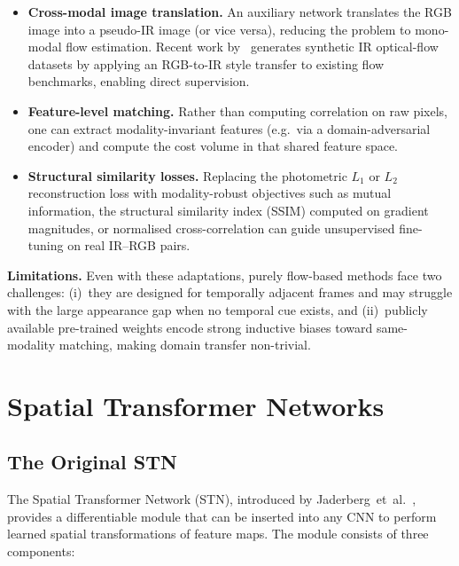 \begin{itemize}
    \item \textbf{Cross-modal image translation.}  An auxiliary network
          translates the RGB image into a pseudo-IR image (or vice
          versa), reducing the problem to mono-modal flow estimation.
          Recent work by~\cite{bird2024rgb2ir} generates synthetic IR
          optical-flow datasets by applying an RGB-to-IR style transfer
          to existing flow benchmarks, enabling direct supervision.
    \item \textbf{Feature-level matching.}  Rather than computing
          correlation on raw pixels, one can extract modality-invariant
          features (e.g.\ via a domain-adversarial encoder) and compute
          the cost volume in that shared feature space.
    \item \textbf{Structural similarity losses.}  Replacing the
          photometric $L_1$ or $L_2$ reconstruction loss with
          modality-robust objectives such as mutual information, the
          structural similarity index (SSIM) computed on gradient
          magnitudes, or normalised cross-correlation can guide
          unsupervised fine-tuning on real IR--RGB pairs.
\end{itemize}

\noindent\textbf{Limitations.}  Even with these adaptations, purely
flow-based methods face two challenges: (i)~they are designed for
temporally adjacent frames and may struggle with the large appearance
gap when no temporal cue exists, and (ii)~publicly available
pre-trained weights encode strong inductive biases toward same-modality
matching, making domain transfer non-trivial.


\section{Spatial Transformer Networks}
\label{sec:stn}

\subsection{The Original STN}

The Spatial Transformer Network (STN), introduced by
Jaderberg~et~al.~\cite{jaderberg2015stn}, provides a differentiable
module that can be inserted into any CNN to perform learned spatial
transformations of feature maps.  The module consists of three
components:

